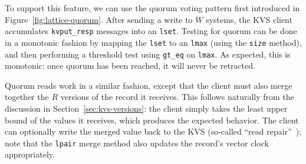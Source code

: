 To support this feature, we can use the \lang quorum voting pattern first
introduced in Figure~\ref{fig:lattice-quorum}. After sending a write to $W$
systems, the KVS client accumulates \texttt{kvput\_resp} messages into an
\texttt{lset}. Testing for quorum can be done in a monotonic fashion by mapping
the \texttt{lset} to an \texttt{lmax} (using the \texttt{size} method), and then
performing a threshold test using \texttt{gt\_eq} on \texttt{lmax}. As expected,
this is monotonic: once quorum has been reached, it will never be retracted.

Quorum reads work in a similar fashion, except that the client must also merge
together the $R$ versions of the record it receives. This follows naturally from
the discussion in Section~\ref{sec:kvs-versions}: the client simply takes the
least upper bound of the values it receives, which produces the expected
behavior. The client can optionally write the merged value back to the KVS
(so-called ``read repair''~\cite{DeCandia2007}); note that the \texttt{lpair}
merge method also updates the record's vector clock appropriately.


